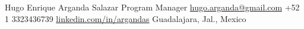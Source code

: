 
\customheader
    {Hugo Enrique Arganda Salazar}
    {Program Manager}
    {\href{mailto:hugo.arganda@gmail.com}{hugo.arganda@gmail.com}}
    {+52 1 3323436739}
    {\href{https://www.linkedin.com/in/argandas}{linkedin.com/in/argandas}}
    {Guadalajara, Jal., Mexico}

